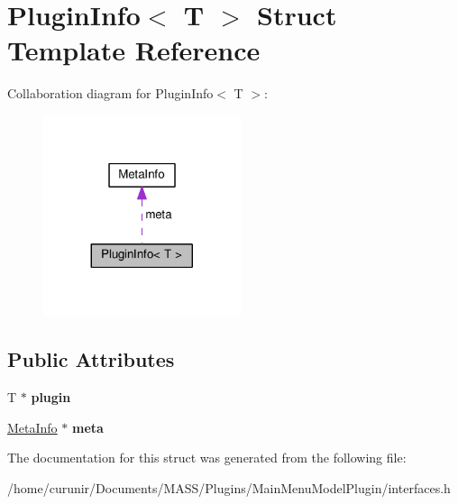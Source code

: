 \hypertarget{struct_plugin_info}{}\section{Plugin\+Info$<$ T $>$ Struct Template Reference}
\label{struct_plugin_info}


Collaboration diagram for Plugin\+Info$<$ T $>$\+:\nopagebreak
\begin{figure}[H]
\begin{center}
\leavevmode
\includegraphics[width=164pt]{struct_plugin_info__coll__graph}
\end{center}
\end{figure}
\subsection*{Public Attributes}
\begin{DoxyCompactItemize}
\item 
T $\ast$ {\bfseries plugin}\hypertarget{struct_plugin_info_a988245c24cc2fe6da1c0312b8835f803}{}\label{struct_plugin_info_a988245c24cc2fe6da1c0312b8835f803}

\item 
\hyperlink{struct_meta_info}{Meta\+Info} $\ast$ {\bfseries meta}\hypertarget{struct_plugin_info_a1f5e1a17fa1569bbdb2cc4bdcd7a5656}{}\label{struct_plugin_info_a1f5e1a17fa1569bbdb2cc4bdcd7a5656}

\end{DoxyCompactItemize}


The documentation for this struct was generated from the following file\+:\begin{DoxyCompactItemize}
\item 
/home/curunir/\+Documents/\+M\+A\+S\+S/\+Plugins/\+Main\+Menu\+Model\+Plugin/interfaces.\+h\end{DoxyCompactItemize}
